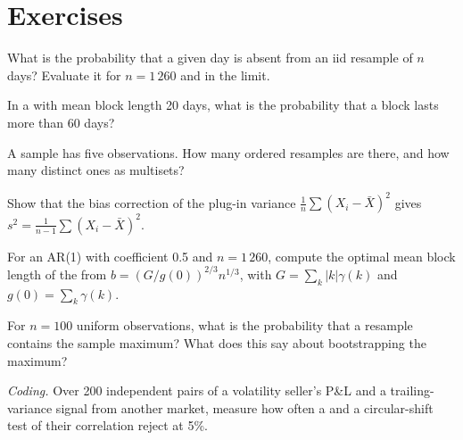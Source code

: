 \section{Exercises}

\begin{exercise}[$\star$]\label{exo:qm:resampling:1}
What is the probability that a given day is absent from an iid  resample of $n$ days? Evaluate it for $n = 1\,260$ and in
the limit.
\end{exercise}

\begin{exercise}[$\star$]\label{exo:qm:resampling:2}
In a  with mean block length 20 days, what is the probability that a block lasts more than 60 days?
\end{exercise}

\begin{exercise}[$\star$]\label{exo:qm:resampling:3}
A sample has five observations. How many ordered  resamples are there, and how many distinct ones as multisets?
\end{exercise}

\begin{exercise}[$\star\star$]\label{exo:qm:resampling:4}
Show that the  bias correction of the plug-in variance $\frac1n\sum(X_i - \bar X)^2$ gives $s^2 = \frac1{n-1}\sum(X_i - \bar X)^2$.
\end{exercise}

\begin{exercise}[$\star\star$]\label{exo:qm:resampling:5}
For an AR(1) with coefficient 0.5 and $n = 1\,260$, compute the optimal mean block length of the  from $b =
(G/g(0))^{2/3}n^{1/3}$, with $G = \sum_k|k|\gamma(k)$ and $g(0) = \sum_k\gamma(k)$.
\end{exercise}

\begin{exercise}[$\star\star$]\label{exo:qm:resampling:6}
For $n = 100$ uniform observations, what is the probability that a  resample contains the sample maximum? What does this say
about bootstrapping the maximum?
\end{exercise}

\begin{exercise}[$\star\star\star$]\label{exo:qm:resampling:7}
\emph{Coding.} Over 200 independent pairs of a volatility seller's P\&L and a trailing-variance signal from another market, measure how
often a  and a circular-shift test of their correlation reject at 5\%.
\end{exercise}

